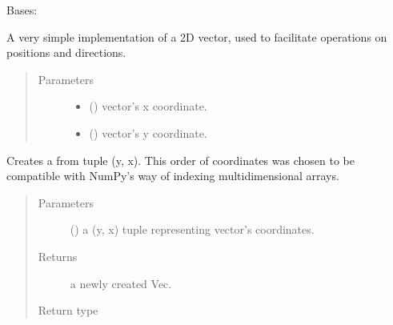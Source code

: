 \documentclass[letterpaper,10pt,english,openany,oneside]{sphinxmanual}
\begin{document}
\begin{fulllineitems}
\label{\detokenize{util:util.Vec}}
Bases: 

A very simple implementation of a 2D vector, used to facilitate operations
on positions and directions.
\begin{quote}\begin{description}
\item[{Parameters}] \leavevmode\begin{itemize}
\item {} 
 () \textendash{} vector’s x coordinate.

\item {} 
 () \textendash{} vector’s y coordinate.

\end{itemize}

\end{description}\end{quote}

\begin{fulllineitems}
\label{\detokenize{util:util.Vec.fromtuple}}
Creates a {\hyperref[\detokenize{util:util.Vec}]{}} from tuple (y, x). This order of coordinates
was chosen to be compatible with NumPy’s way of indexing
multidimensional arrays.
\begin{quote}\begin{description}
\item[{Parameters}] \leavevmode
{} () \textendash{} a (y, x) tuple representing vector’s coordinates.

\item[{Returns}] \leavevmode
a newly created Vec.

\item[{Return type}] \leavevmode
{\hyperref[\detokenize{util:util.Vec}]{}}


\end{description}
\end{quote}
\end{fulllineitems}
\end{fulllineitems}
\end{document}
